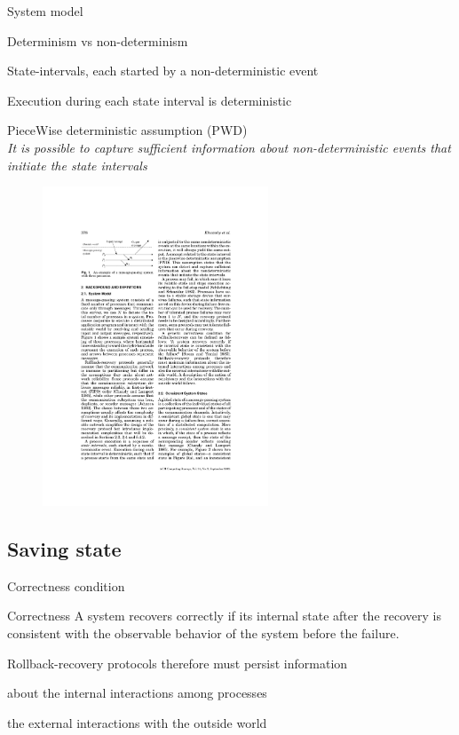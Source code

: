 \begin{frame}{System model}
\begin{block}{Determinism vs non-determinism}
\BIL
\item State-intervals, each started by a non-deterministic event
\item Execution during each state interval is deterministic
\item \alert{PieceWise deterministic} assumption (PWD)\\
\emph{
It is possible to capture sufficient information about non-deterministic events that initiate the state intervals
}
\EIL
\end{block}
\begin{figure}
	\includegraphics[width=0.6\textwidth]{figs/16/system}
\end{figure}	

\end{frame}

\subsection{Saving state}


\begin{frame}{Correctness condition}
\begin{block}{Correctness}
A system recovers correctly if its internal state after the recovery is consistent with the observable behavior of the system before the failure.
\end{block}
\bigskip
\BI
\item Rollback-recovery protocols therefore must persist information
\BI
\item about the internal interactions among processes 
\item the external interactions with the outside world
\EI
\EI
\end{frame}


